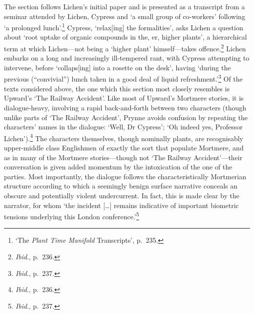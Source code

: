 \documentclass[]{article}
\begin{document}
The section follows Lichen's initial paper and is presented as a
transcript from a seminar attended by Lichen, Cypress and `a small group
of co-workers' following `a prolonged lunch'.\footnote{`The \emph{Plant
  Time Manifold} Transcripts', p.~235.} Cypress, `relax{[}ing{]} the
formalities', asks Lichen a question about `root uptake of organic
compounds in the, er, higher plants', a hierarchical term at which
Lichen---not being a `higher plant' himself---takes offence.\footnote{\emph{Ibid}.,
  p.~236.} Lichen embarks on a long and increasingly ill-tempered rant,
with Cypress attempting to intervene, before `collaps{[}ing{]} into a
rosette on the desk', having `during the previous (``convivial'') lunch
taken in a good deal of liquid refreshment.'\footnote{\emph{Ibid}.,
  p.~237.} Of the texts considered above, the one which this section
most closely resembles is Upward's `The Railway Accident'. Like most of
Upward's Mortmere stories, it is dialogue-heavy, involving a rapid
back-and-forth between two characters (though unlike parts of `The
Railway Accident', Prynne avoids confusion by repeating the characters'
names in the dialogue: `Well, Dr Cypress'; `Oh indeed yes, Professor
Lichen').\footnote{\emph{Ibid}., p.~236.} The characters themselves,
though nominally plants, are recognisably upper-middle class Englishmen
of exactly the sort that populate Mortmere, and as in many of the
Mortmere stories---though not `The Railway Accident'---their
conversation is given added momentum by the intoxication of the one of
the parties. Most importantly, the dialogue follows the
characteristically Mortmerian structure according to which a seemingly
benign surface narrative conceals an obscure and potentially violent
undercurrent. In fact, this is made clear by the narrator, for whom `the
incident {[}\ldots{}{]} remains indicative of important biometric
tensions underlying this London conference.'\footnote{\emph{Ibid}.,
  p.~237.}
\end{document}
